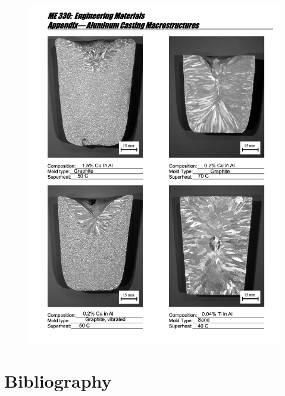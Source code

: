 \documentclass{article}
\begin{document}
\newpage
\begin{figure}[!h!]
    \centering
    \includegraphics[width=\linewidth]{Lab4/ws_p3.png}
\end{figure}

\section{Bibliography}

\printbibliography[heading=none]
\end{document}
